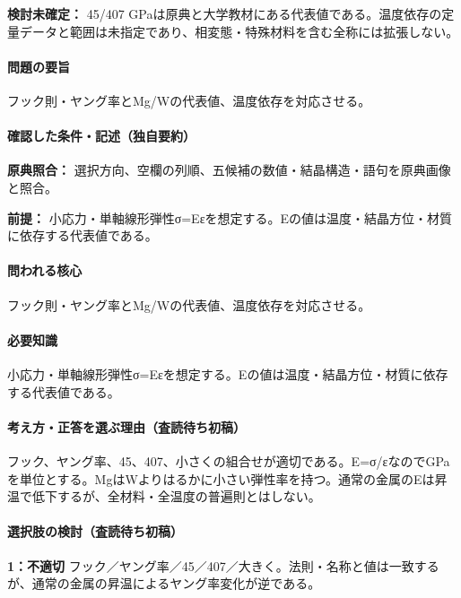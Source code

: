 \par\textbf{検討未確定：} 45/407 GPaは原典と大学教材にある代表値である。温度依存の定量データと範囲は未指定であり、相変態・特殊材料を含む全称には拡張しない。

\paragraph{問題の要旨} フック則・ヤング率とMg/Wの代表値、温度依存を対応させる。

\paragraph{確認した条件・記述（独自要約）}\mbox{}\par

\noindent\textbf{原典照合：} 選択方向、空欄の列順、五候補の数値・結晶構造・語句を原典画像と照合。\par

\noindent\textbf{前提：} 小応力・単軸線形弾性σ=Eεを想定する。Eの値は温度・結晶方位・材質に依存する代表値である。\par

\paragraph{問われる核心} フック則・ヤング率とMg/Wの代表値、温度依存を対応させる。

\paragraph{必要知識} 小応力・単軸線形弾性σ=Eεを想定する。Eの値は温度・結晶方位・材質に依存する代表値である。

\paragraph{考え方・正答を選ぶ理由（査読待ち初稿）} フック、ヤング率、45、407、小さくの組合せが適切である。E=σ/εなのでGPaを単位とする。MgはWよりはるかに小さい弾性率を持つ。通常の金属のEは昇温で低下するが、全材料・全温度の普遍則とはしない。

\paragraph{選択肢の検討（査読待ち初稿）}\mbox{}\par

\noindent\textbf{1：不適切} フック／ヤング率／45／407／大きく。法則・名称と値は一致するが、通常の金属の昇温によるヤング率変化が逆である。\par


